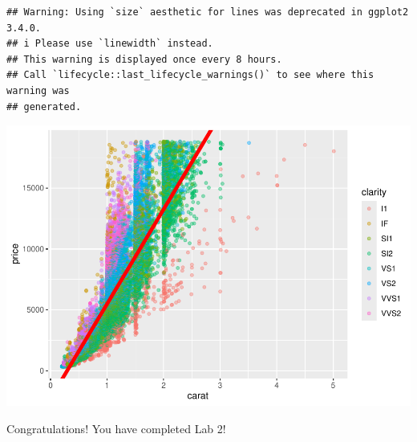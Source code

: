 \documentclass[
]{book}
\begin{document}
\begin{verbatim}
## Warning: Using `size` aesthetic for lines was deprecated in ggplot2 3.4.0.
## i Please use `linewidth` instead.
## This warning is displayed once every 8 hours.
## Call `lifecycle::last_lifecycle_warnings()` to see where this warning was
## generated.
\end{verbatim}

\includegraphics{_main_files/figure-latex/unnamed-chunk-110-2.pdf}

Congratulations! You have completed Lab 2!

  
\end{document}
